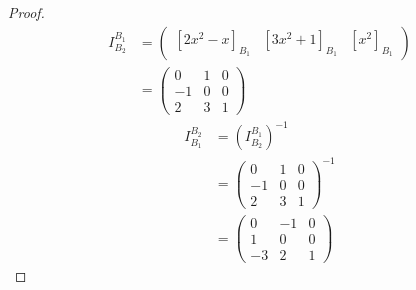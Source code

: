 \documentclass{article}
\begin{document}
\begin{proof}
$ $\newline
\begin{align*}
I_{B_2}^{B_1} &= \begin{pmatrix} [2x^2-x]_{B_1} & [3x^2+1]_{B_1} & [x^2]_{B_1} \end{pmatrix} \\
&= \begin{pmatrix} 0 & 1 & 0 \\ -1 & 0 & 0 \\ 2& 3&1 \end{pmatrix}
\end{align*}
\begin{align*}
I_{B_1}^{B_2} &= (I_{B_2}^{B_1})^{-1} \\
&= \begin{pmatrix} 0 & 1 & 0 \\ -1 & 0 & 0 \\ 2& 3&1 \end{pmatrix} ^{-1}\\
&= \begin{pmatrix} 0 & -1 & 0 \\ 1 & 0 & 0\\ -3 & 2 &1 \end{pmatrix}
\end{align*}
\end{proof} 
\end{document}
